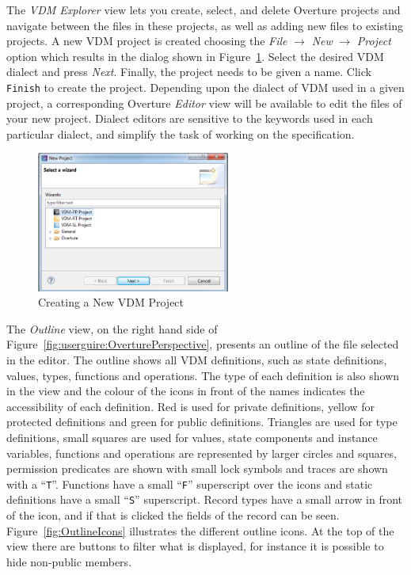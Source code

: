 \documentclass{overturerepchap}
\begin{document}
The \emph{VDM Explorer} view lets you create, select,
and delete Overture projects and navigate between the files in these
projects, as well as adding new files to existing projects. A new VDM
project is created choosing the \emph{File} $ \rightarrow$ \emph{New}
$\rightarrow$ \emph{Project} option which results in the dialog shown in
Figure~\ref{fig:userguide:newOvertureProjectSL}. Select
the desired VDM dialect and press \emph{Next}. Finally, the project
needs to be given a name. Click \texttt{Finish} to create the project.
Depending upon the dialect of VDM used in a given project,
a corresponding Overture \emph{Editor} view will be available to edit the files of
your new project. Dialect editors are sensitive to the keywords used in
each particular dialect, and simplify the task of working on the
specification.

\begin{figure}[!h]
\begin{center}
  \includegraphics[width=2.5in]{figures/newovertureSLproject}
  \caption[labelInTOC]{Creating a New VDM Project}
  \label{fig:userguide:newOvertureProjectSL}
\end{center}
\end{figure}


The \emph{Outline} view, on the right hand side of
Figure~\ref{fig:userguire:OverturePerspective}, presents an outline of
the file selected
in the editor. The outline shows all VDM definitions, such as
state definitions, values, types, functions and operations. The
type of each definition is also shown in the view and the colour of
the icons in front of the names indicates the accessibility of each
definition. Red is
used for private definitions, yellow for protected definitions and
green for public definitions. Triangles are used for
type definitions, small squares are used for values, state components
and instance variables, functions and operations are represented by
larger circles and squares, permission predicates are shown with small
lock symbols and traces are shown with a
``\texttt{T}''. Functions have a small ``\texttt{F}'' superscript over the
icons and static definitions have a small ``\texttt{S}'' superscript.
Record types have a small arrow in front of the
icon, and if that is clicked the fields of the record can be seen.
Figure~\ref{fig:OutlineIcons} illustrates the different outline icons.
At the top of the view there are buttons to filter what is displayed,
for instance it is possible to hide non-public members.
\end{document}
